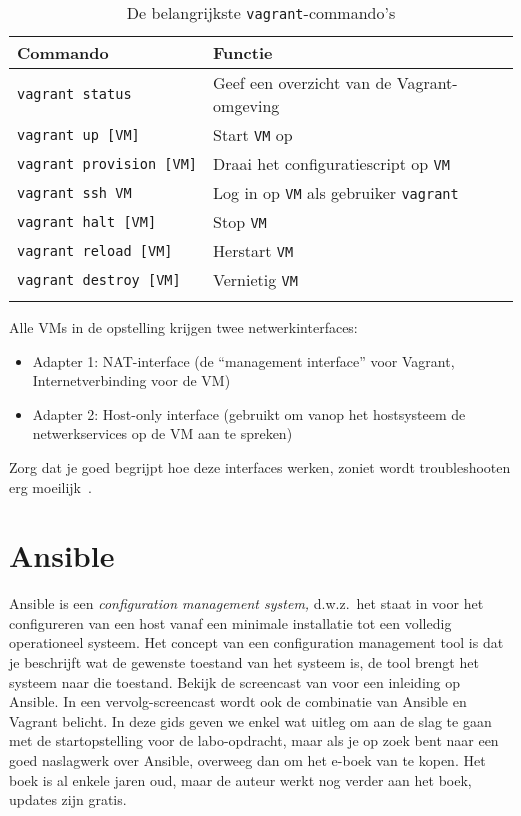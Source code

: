 \begin{longtable}{@{}ll@{}}
  \toprule
  Commando & Functie\tabularnewline
  \midrule
  \endhead
  \texttt{vagrant\ status} & Geef een overzicht van de Vagrant-omgeving\tabularnewline
  \texttt{vagrant\ up\ [VM]} & Start \texttt{VM} op\tabularnewline
  \texttt{vagrant\ provision\ [VM]} & Draai het configuratiescript op \texttt{VM}\tabularnewline
  \texttt{vagrant\ ssh\ VM} & Log in op \texttt{VM} als gebruiker \texttt{vagrant}\tabularnewline
  \texttt{vagrant\ halt\ [VM]} & Stop \texttt{VM}\tabularnewline
  \texttt{vagrant\ reload\ [VM]} & Herstart \texttt{VM}\tabularnewline
  \texttt{vagrant\ destroy\ [VM]} & Vernietig \texttt{VM}\tabularnewline
  \bottomrule
\caption{De belangrijkste \texttt{vagrant}-commando's}%
\label{tab:vagrant-commandos}
\end{longtable}

Alle VMs in de opstelling krijgen twee netwerkinterfaces:

\begin{itemize}
  \item Adapter 1: NAT-interface (de ``management interface'' voor Vagrant, Internetverbinding voor de VM)
  \item Adapter 2: Host-only interface (gebruikt om vanop het hostsysteem de netwerkservices op de VM aan te spreken)
\end{itemize}

Zorg dat je goed begrijpt hoe deze interfaces werken, zoniet wordt troubleshooten erg moeilijk~\autocite{VanVreckem2015a}.

\section{Ansible}%
\label{sec:ansible}

Ansible is een \emph{configuration management system,} d.w.z.\ het staat in voor het configureren van een host vanaf een minimale installatie tot een volledig operationeel systeem. Het concept van een configuration management tool is dat je beschrijft wat de gewenste toestand van het systeem is, de tool brengt het systeem naar die toestand. Bekijk de screencast van \textcite{Weissig2015} voor een inleiding op Ansible. In een vervolg-screencast wordt ook de combinatie van Ansible en Vagrant belicht. In deze gids geven we enkel wat uitleg om aan de slag te gaan met de startopstelling voor de labo-opdracht, maar als je op zoek bent naar een goed naslagwerk over Ansible, overweeg dan om het e-boek van \textcite{Geerling2016} te kopen. Het boek is al enkele jaren oud, maar de auteur werkt nog verder aan het boek, updates zijn gratis.

